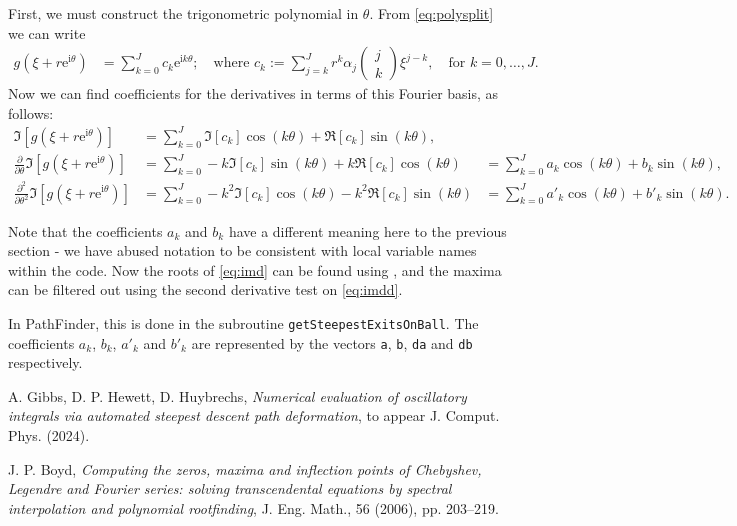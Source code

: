 \documentclass[12pt]{article}
\newcommand{\re}{\mathrm{e}}
\newcommand{\ri}{\mathrm{i}}
\begin{document}
First, we must construct the trigonometric polynomial in $\theta$. From \eqref{eq:polysplit} we can write
\begin{align*}
	g(\xi+r\re^{\ri \theta}) &=
	\sum_{k=0}^J c_k\re^{\ri k \theta};\quad\text{where }c_k:=\sum_{j=k}^Jr^k \alpha_j\left(\begin{array}{c}
		j\\k
	\end{array}\right)
	\xi^{j-k},\quad\text{for }k=0,\ldots,J.
\end{align*}
Now we can find coefficients for the derivatives in terms of this Fourier basis, as follows:
\begin{align}
\Im\left[g(\xi+r\re^{\ri \theta})\right] &= \sum_{k=0}^J \Im [c_k]\cos(k\theta) + \Re[c_k]\sin(k\theta), \nonumber\\
\frac{\partial}{\partial\theta}\Im\left[g(\xi+r\re^{\ri \theta})\right] &= \sum_{k=0}^J -k\Im [c_k]\sin(k\theta) + k\Re[c_k]\cos(k\theta) &= \sum_{k=0}^Ja_k\cos(k\theta)+b_k\sin(k\theta),\label{eq:imd}\\
\frac{\partial^2}{\partial\theta^2}\Im\left[g(\xi+r\re^{\ri \theta})\right] &= \sum_{k=0}^J -k^2\Im [c_k]\cos(k\theta) - k^2\Re[c_k]\sin(k\theta) &= \sum_{k=0}^Ja'_k\cos(k\theta)+b'_k\sin(k\theta).\label{eq:imdd}
\end{align}

Note that the coefficients $a_k$ and $b_k$ have a different meaning here to the previous section - we have abused notation to be consistent with local variable names within the code. Now the roots of \eqref{eq:imd} can be found using \cite{boyd}, and the maxima can be filtered out using the second derivative test on \eqref{eq:imdd}.

In PathFinder, this is done in the subroutine \texttt{getSteepestExitsOnBall}. The coefficients $a_k$, $b_k$, $a'_k$ and $b'_k$ are represented by the vectors \texttt{a}, \texttt{b}, \texttt{da} and \texttt{db} respectively.

\begin{thebibliography}{9}
	
	A. Gibbs, D. P. Hewett, D. Huybrechs, \emph{Numerical evaluation of oscillatory integrals via automated steepest descent path deformation}, to appear J. Comput. Phys. (2024).
	
	J. P. Boyd, \emph{Computing the zeros, maxima and inflection points of Chebyshev, Legendre and Fourier series: solving transcendental equations by spectral interpolation and polynomial rootfinding}, J. Eng. Math., 56 (2006), pp. 203–219.
	
	
\end{thebibliography}
	
\end{document}
